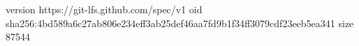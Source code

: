 version https://git-lfs.github.com/spec/v1
oid sha256:4bd589a6c27ab806e234eff3ab25def46aa7fd9b1f34ff3079cdf23eeb5ea341
size 87544
